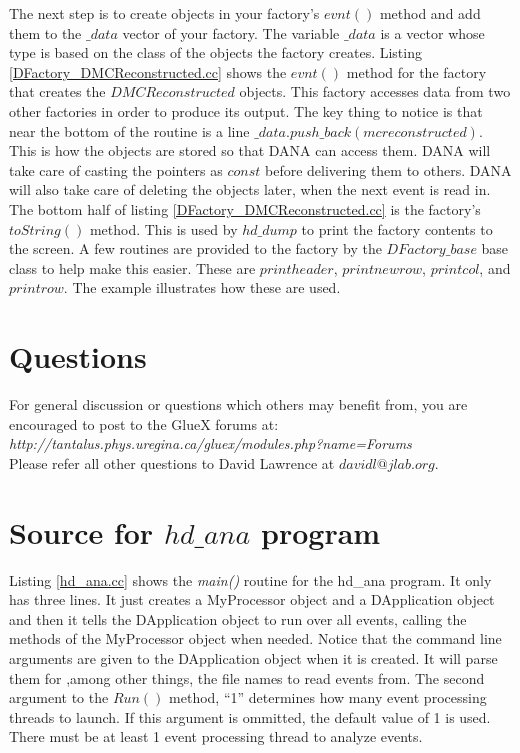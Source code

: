 \documentclass[12pt]{article}
\begin{document}
The next step is to create objects in your factory's $evnt()$ method
and add them to the $\_data$ vector of your factory. The variable
$\_data$ is a vector whose type is based on the class of the objects
the factory creates. Listing \ref{DFactory_DMCReconstructed.cc} shows
the $evnt()$ method for the factory that creates the $DMCReconstructed$
objects. This factory accesses data from two other factories in
order to produce its output. The key thing to notice is that near the bottom
of the routine is a line $\_data.push\_back(mcreconstructed)$. This
is how the objects are stored so that DANA can access them. DANA
will take care of casting the pointers as $const$ before delivering them
to others. DANA will also take care of deleting the objects later, when
the next event is read in.\\




The bottom half of listing \ref{DFactory_DMCReconstructed.cc} is
the factory's $toString()$ method. This is used by $hd\_dump$
to print the factory contents to the screen. A few routines are
provided to the factory by the $DFactory\_base$ base class to
help make this easier. These are $printheader$, $printnewrow$,
$printcol$, and $printrow$. The example illustrates how these
are used.

\section{Questions}
For general discussion or questions which others may benefit from,
you are encouraged to post to the GlueX forums at:\\

{\it http://tantalus.phys.uregina.ca/gluex/modules.php?name=Forums}\\

Please refer all other questions to David Lawrence at $davidl@jlab.org$.

\newpage
\appendix
\section{Source for $hd\_ana$ program}
\label{hd_ana_src}

Listing \ref{hd_ana.cc} shows the {\it main()} routine for the
hd\_ana program. It only has three lines. It just creates a MyProcessor
object and a DApplication object and then it tells the DApplication object
to run over all events, calling the methods of the MyProcessor object
when needed. Notice that the command line arguments are given to 
the DApplication object when it is created. It will parse them for
,among other things, the file names to read events from. The second
argument to the $Run()$ method, ``1'' determines how many event processing
threads to launch. If this argument is ommitted, the default value of 1
is used. There must be at least 1 event processing thread to analyze 
events.
\end{document}

